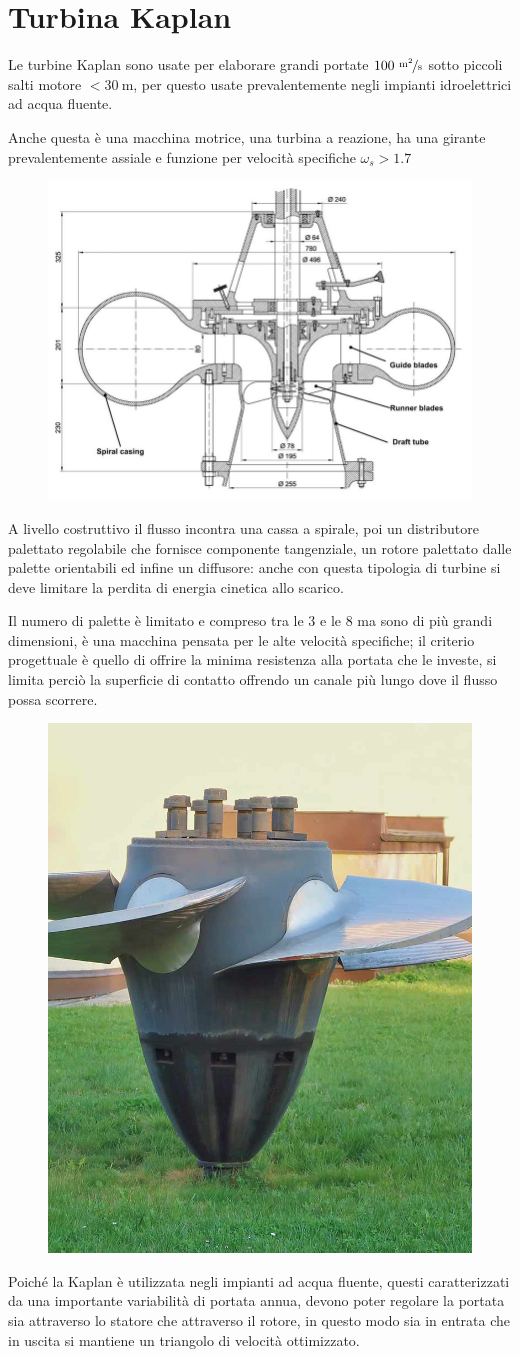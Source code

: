 \documentclass[a4paper, 15pt]{article}
\begin{document}
\section{Turbina Kaplan}		
\begin{adjustwidth}{2in}{}
	Le turbine Kaplan sono usate per elaborare grandi portate $100~\nicefrac{\text{m}^2}{\text{s}}$ sotto piccoli salti motore $<30~\text{m}$, per questo usate prevalentemente negli impianti idroelettrici ad acqua fluente. 
	
	Anche questa è una macchina motrice, una turbina a reazione, ha una girante prevalentemente assiale e funzione per velocità specifiche $\omega_s>1.7$ 
	\begin{figure}[H]
		\centering
		\includegraphics[width=0.5\linewidth]{immagini/turbinakaplan3}
		\label{fig:turbinakaplan3}
	\end{figure}	
	A livello costruttivo il flusso incontra una cassa a spirale, poi un distributore palettato regolabile che fornisce componente tangenziale, un rotore palettato dalle palette orientabili ed infine un diffusore: anche con questa tipologia di turbine si deve limitare la perdita di energia cinetica allo scarico. \newline 
	
	Il numero di palette è limitato e compreso tra le 3 e le 8 ma sono di più grandi dimensioni, è una macchina pensata per le alte velocità specifiche; il criterio progettuale è quello di offrire la minima resistenza alla portata che le investe, si limita perciò la superficie di contatto offrendo un canale più lungo dove il flusso possa scorrere. 
	\begin{figure}[H]
		\centering
		\includegraphics[width=0.3\linewidth]{immagini/turbinakaplan4}
		\label{fig:turbinakaplan4}
	\end{figure}
	Poiché la Kaplan è utilizzata negli impianti ad acqua fluente, questi caratterizzati da una importante variabilità di portata annua, devono poter regolare la portata sia attraverso lo statore che attraverso il rotore, in questo modo sia in entrata che in uscita si mantiene un triangolo di velocità ottimizzato. 
\end{adjustwidth}
\end{document}
